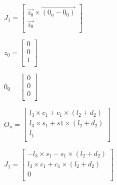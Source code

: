 
\begin{figure}[H] 
\centering

$J_1=
\begin{bmatrix}
\overrightarrow{z_0}\times \overrightarrow{ (0_n-0_0) }\\
 \overrightarrow{z_0}\\
\end{bmatrix}  $
 
  \end{figure}


 \begin{figure}[H]
\centering

$z_0=
\begin{bmatrix}
0\\
0 \\
1\\
\end{bmatrix}  $
 
  \end{figure}

 \begin{figure}[H]
\centering

$0_0=
\begin{bmatrix}
0\\
0 \\
0\\
\end{bmatrix}  $
 
  \end{figure}


 \begin{figure}[H]
\centering

$O_n=
\begin{bmatrix}
l_3\times c_1 +c_1\times(l_2+d_2)\\
l_3 \times s_1 +s1\times (l_2+d_2) \\
l_1\\
\end{bmatrix}  $
 
  \end{figure}


 \begin{figure}[H]
\centering

$J_1=
\begin{bmatrix}
-l_3\times s_1-s_1\times(l_2+d_2)\\
 l_3\times c_1 +c_1\times(l_2+d_2)\\
 0\\
\end{bmatrix}  $
 
 \end{figure} 


